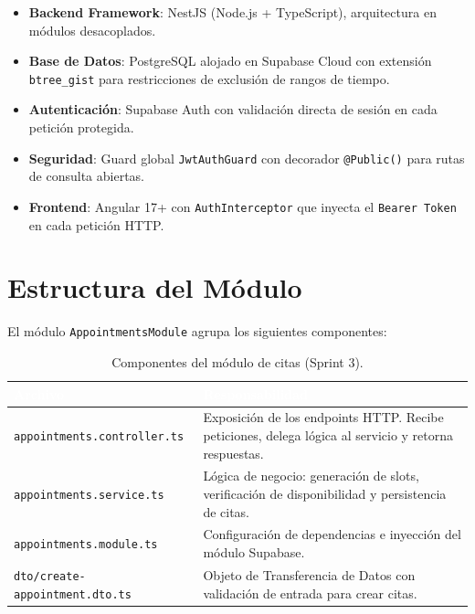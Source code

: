 \documentclass[a4paper,12pt]{article}
\renewcommand{\arraystretch}{1.1}
\begin{document}
    \begin{itemize}
        \item \textbf{Backend Framework}: NestJS (Node.js + TypeScript), arquitectura en módulos desacoplados.
        \item \textbf{Base de Datos}: PostgreSQL alojado en Supabase Cloud con extensión \texttt{btree\_gist} para restricciones de exclusión de rangos de tiempo.
        \item \textbf{Autenticación}: Supabase Auth con validación directa de sesión en cada petición protegida.
        \item \textbf{Seguridad}: Guard global \texttt{JwtAuthGuard} con decorador \texttt{@Public()} para rutas de consulta abiertas.
        \item \textbf{Frontend}: Angular 17+ con \texttt{AuthInterceptor} que inyecta el \texttt{Bearer Token} en cada petición HTTP.
    \end{itemize}

    \section{Estructura del Módulo}

    El módulo \texttt{AppointmentsModule} agrupa los siguientes componentes:

    \begin{table}[H]
    \centering\small\renewcommand{\arraystretch}{1.5}
    \begin{tabular}{|p{5cm}|p{8.5cm}|}
    \hline
    \rowcolor{SKTPrimary}
    \textcolor{white}{\textbf{Archivo}} & \textcolor{white}{\textbf{Responsabilidad}} \\
    \hline
    \texttt{appointments.controller.ts} & Exposición de los endpoints HTTP. Recibe peticiones, delega lógica al servicio y retorna respuestas. \\
    \hline
    \texttt{appointments.service.ts} & Lógica de negocio: generación de slots, verificación de disponibilidad y persistencia de citas. \\
    \hline
    \texttt{appointments.module.ts} & Configuración de dependencias e inyección del módulo Supabase. \\
    \hline
    \texttt{dto/create-appointment.dto.ts} & Objeto de Transferencia de Datos con validación de entrada para crear citas. \\
    \hline
    \end{tabular}
    \caption*{\footnotesize Componentes del módulo de citas (Sprint 3).}
    \end{table}
\end{document}
